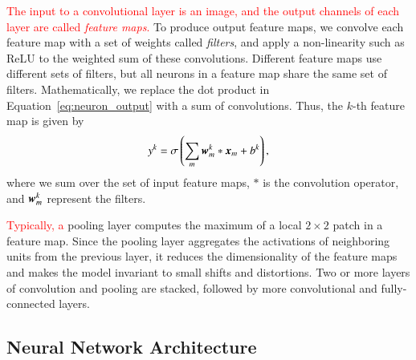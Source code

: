 \documentclass[fleqn,usenatbib]{mnras}
\newcommand{\changed}[1]{\textcolor{red}{#1}}
\begin{document}
\changed{
The input to a convolutional layer is an image, and the output channels of
each layer are called \textit{feature maps}.
}
To produce output feature maps, we convolve each feature map with a set of weights
called \textit{filters},
and apply a non-linearity such as ReLU to the weighted sum of these convolutions.
Different feature maps use different sets of filters,
but all neurons in a feature map share the same set of filters.
Mathematically, we replace the dot product in Equation~\ref{eq:neuron_output}
with a sum of convolutions. Thus, the $k$-th feature map is given by
\begin{equation}
  y^k = \sigma \left( \sum_{m} \bmath{w}_m^k \ast \bmath{x}_m + b^k \right),
\end{equation}
where we sum over the set of input feature maps,
$\ast$ is the convolution operator, and $\bmath{w}_m^k$ represent the filters.

\changed{
Typically, a
}
pooling layer computes the maximum of a local $2\times2$ patch in a feature map.
Since the pooling layer aggregates the activations of neighboring units from the previous layer,
it reduces the dimensionality of the feature maps and
makes the model invariant to small shifts and distortions.
Two or more layers of convolution and pooling are stacked,
followed by more convolutional and fully-connected layers.

\subsection{Neural Network Architecture}
\end{document}
